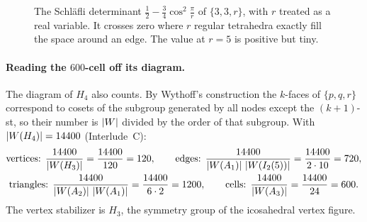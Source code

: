\begin{figure}[ht]
\centering
{}
\caption{The Schl\"afli determinant $\frac12-\frac34\cos^2\frac\pi r$ of $\{3,3,r\}$, with $r$ treated as
a real variable. It crosses zero where $r$ regular tetrahedra exactly fill the space around an edge.
The value at $r=5$ is positive but tiny.}
\label{DYN:fig:gram}
\end{figure}

\paragraph{Reading the $600$-cell off its diagram.} The diagram of $H_4$ also counts. By Wythoff's
construction the $k$-faces of $\{p,q,r\}$ correspond to cosets of the subgroup generated by all nodes
except the $(k+1)$-st, so their number is $\left\lvert W \right\rvert$ divided by the order of that subgroup. With
$\left\lvert W(H_4) \right\rvert=14400$ (Interlude~C):
\begin{gather*}
  \text{vertices: }\frac{14400}{\left\lvert W(H_3) \right\rvert}=\frac{14400}{120}=120,\qquad
  \text{edges: }\frac{14400}{\left\lvert W(A_1) \right\rvert\,\left\lvert W(I_2(5)) \right\rvert}=\frac{14400}{2\cdot10}=720,\\
  \text{triangles: }\frac{14400}{\left\lvert W(A_2) \right\rvert\,\left\lvert W(A_1) \right\rvert}=\frac{14400}{6\cdot2}=1200,\qquad
  \text{cells: }\frac{14400}{\left\lvert W(A_3) \right\rvert}=\frac{14400}{24}=600 .
\end{gather*}
The vertex stabilizer is $H_3$, the symmetry group of the icosahedral vertex figure.

